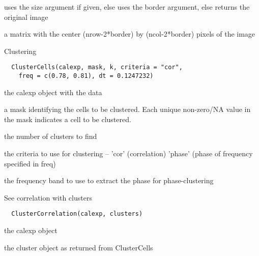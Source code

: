 \documentclass[a4paper]{book}
\begin{document}
%
\begin{Details}\relax
uses the size argument if given, else uses the border
argument, else returns the original image
\end{Details}
%
\begin{Value}
a matrix with the center (nrow-2*border) by
(ncol-2*border) pixels of the image
\end{Value}
%
\begin{Description}\relax
Clustering
\end{Description}
%
\begin{Usage}
\begin{verbatim}
  ClusterCells(calexp, mask, k, criteria = "cor",
    freq = c(0.78, 0.81), dt = 0.1247232)
\end{verbatim}
\end{Usage}
%
\begin{Arguments}
\begin{ldescription}
\item[\code{calexp}] the calexp object with the data

\item[\code{mask}] a mask identifying the cells to be clustered.
Each unique non-zero/NA value in the mask indicates a
cell to be clustered.

\item[\code{k}] the number of clusters to find

\item[\code{criteria}] the criteria to use for clustering --
'cor' (correlation) 'phase' (phase of frequency specified
in freq)

\item[\code{freq}] the frequency band to use to extract the
phase for phase-clustering
\end{ldescription}
\end{Arguments}
%
\begin{Description}\relax
See correlation with clusters
\end{Description}
%
\begin{Usage}
\begin{verbatim}
  ClusterCorrelation(calexp, clusters)
\end{verbatim}
\end{Usage}
%
\begin{Arguments}
\begin{ldescription}
\item[\code{calexp}] the calexp object

\item[\code{clusters}] the cluster object as returned from
ClusterCells
\end{ldescription}
\end{Arguments}
\end{document}
